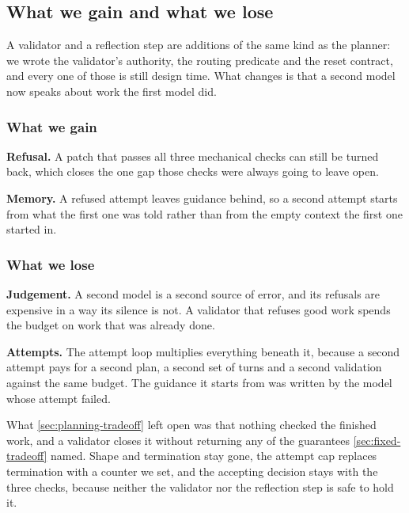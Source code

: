 \subsection{What we gain and what we lose}
\label{sec:validation-tradeoff}

A validator and a reflection step are additions of the same kind as the planner: we wrote the
validator's authority, the routing predicate and the reset contract, and every one of those is
still design time. What changes is that a second model now speaks about work the first model did.

\subsubsection{What we gain}

\bi

\item \textbf{Refusal.} A patch that passes all three mechanical checks can still be turned back,
which closes the one gap those checks were always going to leave open.

\item \textbf{Memory.} A refused attempt leaves guidance behind, so a second attempt starts from
what the first one was told rather than from the empty context the first one started in.

\ei

\subsubsection{What we lose}

\bi

\item \textbf{Judgement.} A second model is a second source of error, and its refusals are
expensive in a way its silence is not. A validator that refuses good work spends the budget on work
that was already done.

\item \textbf{Attempts.} The attempt loop multiplies everything beneath it, because a second attempt
pays for a second plan, a second set of turns and a second validation against the same budget. The
guidance it starts from was written by the model whose attempt failed.

\ei

What \cref{sec:planning-tradeoff} left open was that nothing checked the finished work, and a
validator closes it without returning any of the guarantees \cref{sec:fixed-tradeoff} named. Shape
and termination stay gone, the attempt cap replaces termination with a counter we set, and the
accepting decision stays with the three checks, because neither the validator nor the reflection
step is safe to hold it.

